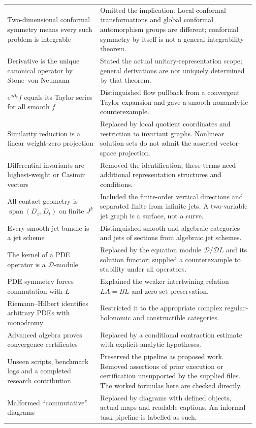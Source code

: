 \documentclass[11pt,a4paper]{article}
\numberwithin{equation}{section}
\theoremstyle{definition}
\theoremstyle{plain}
\theoremstyle{remark}
\newcommand{\Span}{\operatorname{span}}
\begin{document}
\begin{longtable}{@{}>{\raggedright\arraybackslash}p{.35\linewidth}>{\raggedright\arraybackslash}p{.59\linewidth}@{}}
Two-dimensional conformal symmetry means every such problem is integrable & Omitted the implication. Local conformal transformations and global conformal automorphism groups are different; conformal symmetry by itself is not a general integrability theorem.\\
Derivative is the unique canonical operator by Stone--von Neumann & Stated the actual unitary-representation scope; general derivations are not uniquely determined by that theorem.\\
$e^{a\partial_x}f$ equals its Taylor series for all smooth $f$ & Distinguished flow pullback from a convergent Taylor expansion and gave a smooth nonanalytic counterexample.\\
Similarity reduction is a linear weight-zero projection & Replaced by local quotient coordinates and restriction to invariant graphs. Nonlinear solution sets do not admit the asserted vector-space projection.\\
Differential invariants are highest-weight or Casimir vectors & Removed the identification; these terms need additional representation structures and conditions.\\
All contact geometry is $\Span(D_x,D_t)$ on finite $J^k$ & Included the finite-order vertical directions and separated finite from infinite jets. A two-variable jet graph is a surface, not a curve.\\
Every smooth jet bundle is a jet scheme & Distinguished smooth and algebraic categories and jets of sections from algebraic jet schemes.\\
The kernel of a PDE operator is a $\mathcal D$-module & Replaced by the equation module $\mathcal D/\mathcal D L$ and its solution functor; supplied a counterexample to stability under all operators.\\
PDE symmetry forces commutation with $L$ & Explained the weaker intertwining relation $LA=BL$ and zero-set preservation.\\
Riemann--Hilbert identifies arbitrary PDEs with monodromy & Restricted it to the appropriate complex regular-holonomic and constructible categories.\\
Advanced algebra proves convergence certificates & Replaced by a conditional contraction estimate with explicit analytic hypotheses.\\
Unseen scripts, benchmark logs and a completed research contribution & Preserved the pipeline as proposed work. Removed assertions of prior execution or certification unsupported by the supplied files. The worked formulas here are checked directly.\\
Malformed ``commutative'' diagrams & Replaced by diagrams with defined objects, actual maps and readable captions. An informal task pipeline is labelled as such.\\
\bottomrule
\end{longtable}
\end{document}
